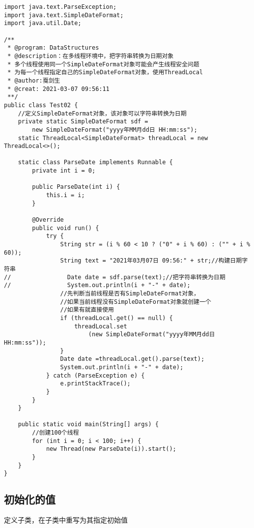 \documentclass[a4paper]{report}
\begin{document}
\begin{Verbatim}[frame=single,numbersep=5pt,xleftmargin=1.5em,xrightmargin=1.5em]
import java.text.ParseException;
import java.text.SimpleDateFormat;
import java.util.Date;

/**
 * @program: DataStructures
 * @description：在多线程环境中，把字符串转换为日期对象
 * 多个线程使用同一个SimpleDateFormat对象可能会产生线程安全问题
 * 为每一个线程指定自己的SimpleDateFormat对象，使用ThreadLocal
 * @author:戛剑生
 * @creat: 2021-03-07 09:56:11
 **/
public class Test02 {
    //定义SimpleDateFormat对象，该对象可以字符串转换为日期
    private static SimpleDateFormat sdf =
        new SimpleDateFormat("yyyy年MM月dd日 HH:mm:ss");
    static ThreadLocal<SimpleDateFormat> threadLocal = new ThreadLocal<>();

    static class ParseDate implements Runnable {
        private int i = 0;

        public ParseDate(int i) {
            this.i = i;
        }

        @Override
        public void run() {
            try {
                String str = (i % 60 < 10 ? ("0" + i % 60) : ("" + i % 60));
                String text = "2021年03月07日 09:56:" + str;//构建日期字符串
//                Date date = sdf.parse(text);//把字符串转换为日期
//                System.out.println(i + "-" + date);
                //先判断当前线程是否有SimpleDateFormat对象，
                //如果当前线程没有SimpleDateFormat对象就创建一个
                //如果有就直接使用
                if (threadLocal.get() == null) {
                    threadLocal.set
                        (new SimpleDateFormat("yyyy年MM月dd日 HH:mm:ss"));
                }
                Date date =threadLocal.get().parse(text);
                System.out.println(i + "-" + date);
            } catch (ParseException e) {
                e.printStackTrace();
            }
        }
    }

    public static void main(String[] args) {
        //创建100个线程
        for (int i = 0; i < 100; i++) {
            new Thread(new ParseDate(i)).start();
        }
    }
}
\end{Verbatim}
\subsection{初始化的值}
定义子类，在子类中重写为其指定初始值
\end{document}
